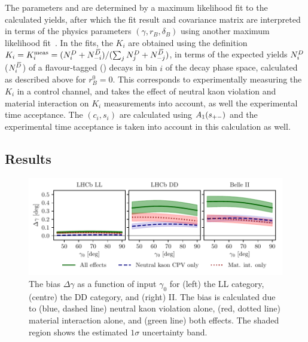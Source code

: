 The parameters \xpm and \ypm are determined by a maximum likelihood fit to the calculated yields, after which the fit result and covariance matrix are interpreted in terms of the physics parameters $(\gamma, r_B, \delta_B)$ using another maximum likelihood fit~\cite{Gammacombo2016}. In the fits, the $K_i$ are obtained using the definition $K_i=K_i^\text{meas}=({N^{D}_i + N^{\kern 0.18em\overline{\kern -0.18em D}}_{-i}})/({\sum_j N^{D}_j +N^{\kern 0.18em\overline{\kern -0.18em D}}_{-j}})$, in terms of the expected yields $N^{D}_i$ ($N^{{\kern 0.18em\overline{\kern -0.18em D}}}_i$) of a flavour-tagged \Dz (\Dzb) decays in bin $i$ of the \D decay phase space, calculated as described above for $r_B^0=0$. This corresponds to experimentally measuring the $K_i$ in a control channel, and takes the effect of neutral kaon \CP violation and material interaction on $K_i$ measurements into account, as well the experimental time acceptance. The $(c_i, s_i)$ are calculated using $A_1(s_{+-})$ and the experimental time acceptance is taken into account in this calculation as well. 







 











\subsection{Results} %
\label{sub:bias_results}


\begin{figure}[tbp]
    \centering
    \includegraphics{figures/ks_chapter/gamma_scan_Belle2018_50_g.pdf}
    \caption{The bias $\Delta \gamma$ as a function of input $\gamma_0$ for (left) the LL \lhcb category, (centre) the DD \lhcb category, and (right) \belle II. The bias is calculated due to (blue, dashed line) neutral kaon \CP violation alone, (red, dotted line) material interaction alone, and (green line) both effects. The shaded region shows the estimated $1\sigma$ uncertainty band.}
    \label{fig:compare_experiments}
\end{figure}


